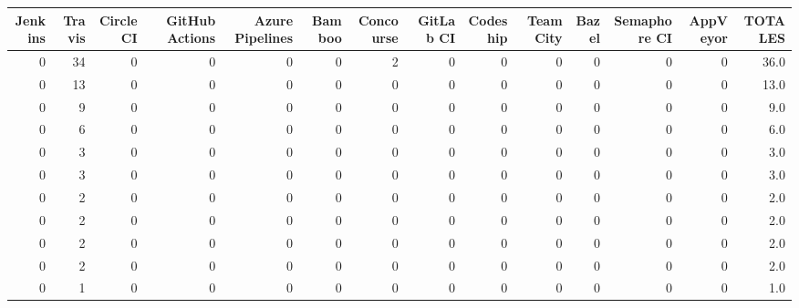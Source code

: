 \begin{tabular}{rrrrrrrrrrrrrr}
\toprule
 Jenkins &  Travis &  Circle CI &  GitHub Actions &  Azure Pipelines &  Bamboo &  Concourse &  GitLab CI &  Codeship &  TeamCity &  Bazel &  Semaphore CI &  AppVeyor &  TOTALES \\
\midrule
       0 &      34 &          0 &               0 &                0 &       0 &          2 &          0 &         0 &         0 &      0 &             0 &         0 &     36.0 \\
       0 &      13 &          0 &               0 &                0 &       0 &          0 &          0 &         0 &         0 &      0 &             0 &         0 &     13.0 \\
       0 &       9 &          0 &               0 &                0 &       0 &          0 &          0 &         0 &         0 &      0 &             0 &         0 &      9.0 \\
       0 &       6 &          0 &               0 &                0 &       0 &          0 &          0 &         0 &         0 &      0 &             0 &         0 &      6.0 \\
       0 &       3 &          0 &               0 &                0 &       0 &          0 &          0 &         0 &         0 &      0 &             0 &         0 &      3.0 \\
       0 &       3 &          0 &               0 &                0 &       0 &          0 &          0 &         0 &         0 &      0 &             0 &         0 &      3.0 \\
       0 &       2 &          0 &               0 &                0 &       0 &          0 &          0 &         0 &         0 &      0 &             0 &         0 &      2.0 \\
       0 &       2 &          0 &               0 &                0 &       0 &          0 &          0 &         0 &         0 &      0 &             0 &         0 &      2.0 \\
       0 &       2 &          0 &               0 &                0 &       0 &          0 &          0 &         0 &         0 &      0 &             0 &         0 &      2.0 \\
       0 &       2 &          0 &               0 &                0 &       0 &          0 &          0 &         0 &         0 &      0 &             0 &         0 &      2.0 \\
       0 &       1 &          0 &               0 &                0 &       0 &          0 &          0 &         0 &         0 &      0 &             0 &         0 &      1.0 \\

\end{tabular}
